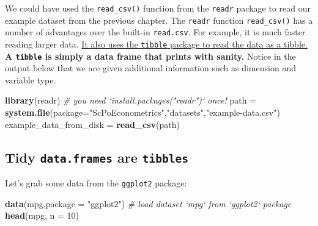 \documentclass[]{book}
\newenvironment{Shaded}{\begin{snugshade}}{\end{snugshade}}
\newcommand{\KeywordTok}[1]{\textcolor[rgb]{0.13,0.29,0.53}{\textbf{#1}}}
\newcommand{\DataTypeTok}[1]{\textcolor[rgb]{0.13,0.29,0.53}{#1}}
\newcommand{\DecValTok}[1]{\textcolor[rgb]{0.00,0.00,0.81}{#1}}
\newcommand{\StringTok}[1]{\textcolor[rgb]{0.31,0.60,0.02}{#1}}
\newcommand{\CommentTok}[1]{\textcolor[rgb]{0.56,0.35,0.01}{\textit{#1}}}
\newcommand{\NormalTok}[1]{#1}
\begin{document}
We could have used the \texttt{read\_csv()} function from the
\texttt{readr} package to read our example dataset from the previous
chapter. The \texttt{readr} function \texttt{read\_csv()} has a number
of advantages over the built-in \texttt{read.csv}. For example, it is
much faster reading larger data.
\href{https://cran.r-project.org/web/packages/tibble/vignettes/tibble.html}{It
also uses the \texttt{tibble} package to read the data as a tibble.}
\textbf{A \texttt{tibble} is simply a data frame that prints with
sanity.} Notice in the output below that we are given additional
information such as dimension and variable type.

\begin{Shaded}
\begin{Highlighting}[]
\KeywordTok{library}\NormalTok{(readr)  }\CommentTok{# you need `install.packages("readr")` once!}
\NormalTok{path =}\StringTok{ }\KeywordTok{system.file}\NormalTok{(}\DataTypeTok{package=}\StringTok{"ScPoEconometrics"}\NormalTok{,}\StringTok{"datasets"}\NormalTok{,}\StringTok{"example-data.csv"}\NormalTok{)}
\NormalTok{example_data_from_disk =}\StringTok{ }\KeywordTok{read_csv}\NormalTok{(path)}
\end{Highlighting}
\end{Shaded}

\subsection{\texorpdfstring{Tidy \texttt{data.frames} are
\texttt{tibbles}}{Tidy data.frames are tibbles}}\label{tidy-data.frames-are-tibbles}

Let's grab some data from the \texttt{ggplot2} package:

\begin{Shaded}
\begin{Highlighting}[]
\KeywordTok{data}\NormalTok{(mpg,}\DataTypeTok{package =} \StringTok{"ggplot2"}\NormalTok{)  }\CommentTok{# load dataset `mpg` from `ggplot2` package}
\KeywordTok{head}\NormalTok{(mpg, }\DataTypeTok{n =} \DecValTok{10}\NormalTok{)}
\end{Highlighting}
\end{Shaded}
\end{document}
